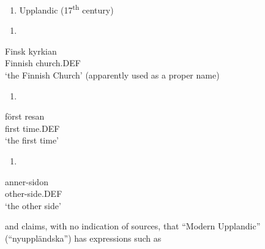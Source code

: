 \begin{enumerate} %
\item 
Upplandic (17\textsuperscript{th} century)
\end{enumerate} %
\setcounter{listLFOxcviiileveli}{0}
\begin{enumerate} %
\item 
\end{enumerate} %
\ea\label{}
\gll Finsk  kyrkian\\


Finnish  church.DEF\\ %


‘the Finnish Church’ (apparently used as a proper name)
\z


\begin{enumerate} %
\item 
\end{enumerate} %
\ea\label{}
\gll först  resan\\


first  time.DEF\\ %


 ‘the first time’
\z


\begin{enumerate} %
\item 
\end{enumerate} %
\ea\label{}
\gll anner-sidon\\


other-side.DEF\\ %


 ‘the other side’
\z


and claims, with no indication of sources, that “Modern Upplandic” (“nyupp\-ländska”) has expressions such as


